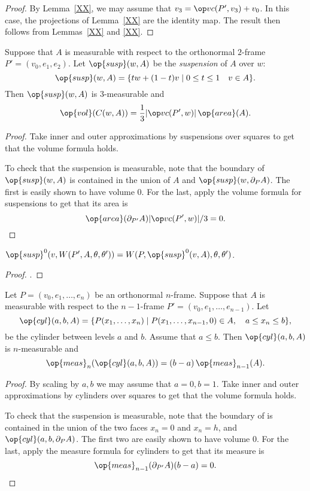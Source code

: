 \begin{proof} By Lemma~\ref{XX}, we may assume that $v_3 = \vc(P',v_3) +
v_0$.  In this case, the projections of Lemma~\ref{XX} are the identity map.
The result then follows from Lemmas~\ref{XX} and \ref{XX}.
\end{proof}

\begin{lemma}[suspension] Suppose
that $A$ is measurable with respect to the orthonormal $2$-frame
$P'=(v_0,e_1,e_2)$.  Let $\op{susp}(w,A)$ be the {\it suspension\/}
of $A$ over $w$:
    $$
    \op{susp}(w,A) = \{ t w + (1-t) v \mid 0\le t\le 1\quad v\in
    A\}.
    $$
Then $\op{susp}(w,A)$ is $3$-measurable and
    $$
    \op{vol}(C(w,A)) = \frac{1}{3} |\vc(P',w)|\, \op{area}(A).
    $$
\end{lemma}

\begin{proof}
Take inner and outer approximations by suspensions over squares to
get that the volume formula holds.

To check that the suspension is measurable, note that the boundary
of $\op{susp}(w,A)$ is contained in the union of $A$ and
$\op{susp}(w,\partial_P A)$. The first is easily shown to have
volume $0$. For the last, apply the volume formula for suspensions
to get that its area is
$$\op{area}(\partial_{P'} A) |\vc(P',w)| /3 = 0.$$
\end{proof}

\begin{lemma}  $\op{susp}^0(v,W(P',A,\theta,\theta')) =
W(P,\op{susp}^0(v,A),\theta,\theta')$.
\end{lemma}

\begin{proof} .
\end{proof}

\begin{lemma}[cylinder] Let $P=(v_0,e_1,\ldots,e_n)$ be an orthonormal $n$-frame.  Suppose
that $A$ is measurable with respect to the $n-1$-frame
$P'=(v_0,e_1,\ldots,e_{n-1})$.  Let
    $$
    \op{cyl}(a,b,A) = \{ P(x_1,\ldots,x_n) \mid P(x_1,\ldots,x_{n-1},0)\in A,
    \quad a\le x_n\le b\},
    $$
be the cylinder between levels $a$ and $b$.   Assume that $a\le b$.
Then $\op{cyl}(a,b,A)$ is $n$-measurable and
    $$
    \op{meas}_n(\op{cyl}(a,b,A)) = (b-a)\,\op{meas}_{n-1}(A).
    $$
\end{lemma}

\begin{proof}
By scaling by $a,b$ we may assume that $a=0,b=1$.  Take inner and
outer approximations by cylinders over squares to get that the
volume formula holds.

To check that the suspension is measurable, note that the boundary
of is contained in the union of the two faces $x_n=0$ and $x_n=h$,
and $\op{cyl}(a,b,\partial_P A)$. The first two are easily shown to
have volume $0$.  For the last, apply the measure formula for
cylinders to get that its measure is
$$\op{meas}_{n-1}(\partial_{P'} A)(b-a) = 0.$$
\end{proof}


